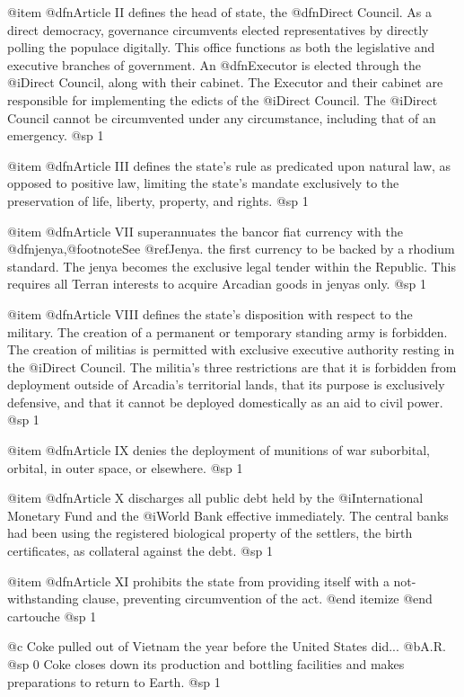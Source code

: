 @item
@dfn{Article II} defines the head of state, the @dfn{Direct Council}. As a direct democracy, governance circumvents elected representatives by directly polling the populace digitally. This office functions as both the legislative and executive branches of government. An @dfn{Executor} is elected through the @i{Direct Council}, along with their cabinet. The Executor and their cabinet are responsible for implementing the edicts of the @i{Direct Council}. The @i{Direct Council} cannot be circumvented under any circumstance, including that of an emergency.
@sp 1

@item
@dfn{Article III} defines the state's rule as predicated upon natural law, as opposed to positive law, limiting the state's mandate exclusively to the preservation of life, liberty, property, and rights.
@sp 1

@item
@dfn{Article VII} superannuates the bancor fiat currency with the @dfn{jenya},@footnote{See @ref{Jenya}.} the first currency to be backed by a rhodium standard. The jenya becomes the exclusive legal tender within the Republic. This requires all Terran interests to acquire Arcadian goods in jenyas only.
@sp 1

@item
@dfn{Article VIII} defines the state's disposition with respect to the military. The creation of a permanent or temporary standing army is forbidden. The creation of militias is permitted with exclusive executive authority resting in the @i{Direct Council}. The militia's three restrictions are that it is forbidden from deployment outside of Arcadia's territorial lands, that its purpose is exclusively defensive, and that it cannot be deployed domestically as an aid to civil power.
@sp 1

@item
@dfn{Article IX} denies the deployment of munitions of war suborbital, orbital, in outer space, or elsewhere.
@sp 1

@item
@dfn{Article X} discharges all public debt held by the @i{International Monetary Fund} and the @i{World Bank} effective immediately. The central banks had been using the registered biological property of the settlers, the birth certificates, as collateral against the debt.
@sp 1

@item
@dfn{Article XI} prohibits the state from providing itself with a not-withstanding clause, preventing circumvention of the act.
@end itemize
@end cartouche
@sp 1

@c Coke pulled out of Vietnam the year before the United States did...
@b{A.R.}
@sp 0
Coke closes down its production and bottling facilities and makes preparations to return to Earth.
@sp 1

